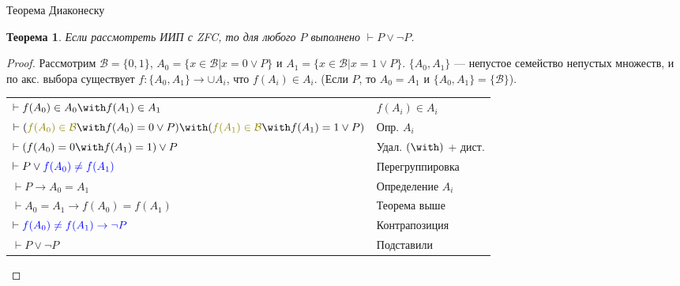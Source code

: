 \documentclass[aspectratio=169]{beamer}
\newtheorem{thm}{Теорема}[section]
\begin{document}
\begin{frame}{Теорема Диаконеску}
\begin{thm}Если рассмотреть ИИП с ZFC, то для любого $P$ выполнено $\vdash P \vee \neg P$.\end{thm}
\begin{proof}Рассмотрим $\mathcal{B} = \{0,1\}$, $A_0 = \{ x \in \mathcal{B} | x = 0 \vee P \}$ и 
$A_1 = \{ x \in \mathcal{B} | x = 1 \vee P\}$.
$\{A_0,A_1\}$ --- непустое семейство непустых множеств, и по акс. выбора существует
$f: \{A_0,A_1\} \rightarrow \cup A_i$, что $f(A_i) \in A_i$. (Если $P$, то $A_0 = A_1$ и \cup $\{A_0,A_1\} = \{\mathcal{B}\}$).

\vspace{0.3cm}
\begin{tabular}{ll}
$\vdash f(A_0) \in A_0 \with f(A_1) \in A_1$ & $f(A_i) \in A_i$\\
$\vdash({\color{olive}f(A_0) \in \mathcal{B}} \with f(A_0) = 0 \vee P) \with ({\color{olive}f(A_1) \in \mathcal{B}} \with f(A_1) = 1 \vee P)$ & Опр. $A_i$\\
$\vdash (f(A_0) = 0 \with f(A_1) = 1) \vee P$ & Удал. $(\with)$ + дист.\\
$\vdash P\vee{\color{blue}f(A_0) \ne f(A_1)}$ & Перегруппировка\\\pause
$\vdash P \rightarrow A_0 = A_1$ & Определение $A_i$\\
$\vdash A_0 = A_1 \rightarrow f(A_0) = f(A_1)$ & Теорема выше\\
$\vdash \color{blue} f(A_0) \ne f(A_1) \rightarrow \neg P$ & Контрапозиция\\
$\vdash P \vee \neg P$ & Подставили
\end{tabular}

\end{proof}
\end{frame}
\end{document}
